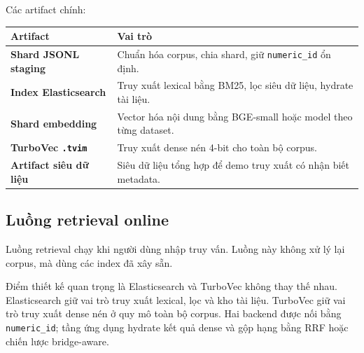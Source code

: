 \documentclass[11pt,a4paper]{article}
\begin{document}
Các artifact chính:

\begin{tabularx}{\textwidth}{>{\bfseries}p{} Y}
\toprule
Artifact & Vai trò \\
\midrule
Shard JSONL staging & Chuẩn hóa corpus, chia shard, giữ \texttt{numeric\_id} ổn định. \\
Index Elasticsearch & Truy xuất lexical bằng BM25, lọc siêu dữ liệu, hydrate tài liệu. \\
Shard embedding & Vector hóa nội dung bằng BGE-small hoặc model theo từng dataset. \\
TurboVec \texttt{.tvim} & Truy xuất dense nén 4-bit cho toàn bộ corpus. \\
Artifact siêu dữ liệu & Siêu dữ liệu tổng hợp để demo truy xuất có nhận biết metadata. \\
\bottomrule
\end{tabularx}

\subsection{Luồng retrieval online}

Luồng retrieval chạy khi người dùng nhập truy vấn. Luồng này không xử lý lại corpus, mà dùng
các index đã xây sẵn.

\begin{center}
\end{center}

Điểm thiết kế quan trọng là Elasticsearch và TurboVec không thay thế nhau. Elasticsearch giữ
vai trò truy xuất lexical, lọc và kho tài liệu. TurboVec giữ vai trò truy xuất dense
nén ở quy mô toàn bộ corpus. Hai backend được nối bằng \texttt{numeric\_id}; tầng ứng dụng
hydrate kết quả dense và gộp hạng bằng RRF hoặc chiến lược bridge-aware.
\end{document}
